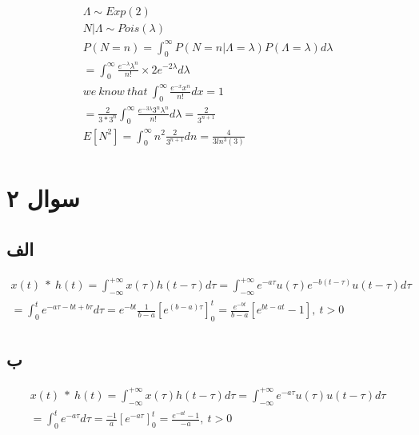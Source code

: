 \documentclass{article}[12pt]
\begin{document}
\begin{eqnarray*}
	\begin{gathered}
				\Lambda \sim Exp( 2)\\
				N|\Lambda \sim Pois( \lambda )\\
				P( N=n) =\int _{0}^{\infty } P( N=n|\Lambda =\lambda ) P( \Lambda =\lambda ) d\lambda \\
				=\int _{0}^{\infty }\frac{e^{-\lambda } \lambda ^{n}}{n!} \times 2e^{-2\lambda } d\lambda \\
				we\ know\ that\ \int _{0}^{\infty }\frac{e^{-x} x^{n}}{n!} dx=1\\
				=\frac{2}{3*3^{n}}\int _{0}^{\infty }\frac{e^{-3\lambda } 3^{n} \lambda ^{n}}{n!} d\lambda =\frac{2}{3^{n+1}}\\
				E\left[ N^{2}\right] =\int _{0}^{\infty } n^{2}\frac{2}{3^{n+1}} dn=\frac{4}{3ln^{3}( 3)}
	\end{gathered}
\end{eqnarray*}


\section{سوال ۲}
\subsection{الف}
\begin{equation}
	\begin{gathered}
			x( t) \ *\ h( t) =\int _{-\infty }^{+\infty } x( \tau ) h( t-\tau ) d\tau =\int _{-\infty }^{+\infty } e^{-a\tau } u( \tau ) e^{-b( t-\tau )} u( t-\tau ) d\tau \\
			=\int _{0}^{t} e^{-a\tau -bt+b\tau } d\tau =e^{-bt}\frac{1}{b-a}\left[ e^{( b-a) \tau }\right]_{0}^{t} =\frac{e^{-bt}}{b-a}\left[ e^{bt-at} -1\right] ,\ t >0
	\end{gathered}
\end{equation}
\subsection{ب}

\begin{equation}
	\begin{gathered}
			x( t) \ *\ h( t) =\int _{-\infty }^{+\infty } x( \tau ) h( t-\tau ) d\tau =\int _{-\infty }^{+\infty } e^{-a\tau } u( \tau ) u( t-\tau ) d\tau \\
			=\int _{0}^{t} e^{-a\tau } d\tau =\frac{-1}{a}\left[ e^{-a\tau }\right]_{0}^{t} =\frac{e^{-at} -1}{-a} ,\ t >0
	\end{gathered}
\end{equation}
\end{document}
